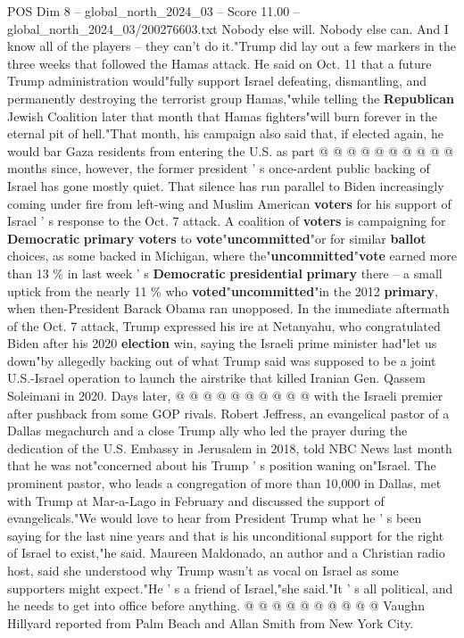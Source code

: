 \begin{textsample}{POS Dim 8 – global\_north\_2024\_03 – Score 11.00 – global\_north\_2024\_03/200276603.txt}
Nobody else will.
Nobody else can.
And I know all of the players -- they can't do it."Trump did lay out a few markers in the three weeks that followed the Hamas attack.
He said on Oct. 11 that a future Trump administration would"fully support Israel defeating, dismantling, and permanently destroying the terrorist group Hamas,"while telling the \textbf{Republican} Jewish Coalition later that month that Hamas fighters"will burn forever in the eternal pit of hell."That month, his campaign also said that, if elected again, he would bar Gaza residents from entering the U.S. as part @ @ @ @ @ @ @ @ @ @ months since, however, the former president ' s once-ardent public backing of Israel has gone mostly quiet.
That silence has run parallel to Biden increasingly coming under fire from left-wing and Muslim American \textbf{voters} for his support of Israel ' s response to the Oct. 7 attack.
A coalition of \textbf{voters} is campaigning for \textbf{Democratic} \textbf{primary} \textbf{voters} to \textbf{vote}"\textbf{uncommitted}"or for similar \textbf{ballot} choices, as some backed in Michigan, where the"\textbf{uncommitted}"\textbf{vote} earned more than 13 \% in last week ' s \textbf{Democratic} \textbf{presidential} \textbf{primary} there -- a small uptick from the nearly 11 \% who \textbf{voted}"\textbf{uncommitted}"in the 2012 \textbf{primary}, when then-President Barack Obama ran unopposed.
In the immediate aftermath of the Oct. 7 attack, Trump expressed his ire at Netanyahu, who congratulated Biden after his 2020 \textbf{election} win, saying the Israeli prime minister had"let us down"by allegedly backing out of what Trump said was supposed to be a joint U.S.-Israel operation to launch the airstrike that killed Iranian Gen.
Qassem Soleimani in 2020.
Days later, @ @ @ @ @ @ @ @ @ @ with the Israeli premier after pushback from some GOP rivals.
Robert Jeffress, an evangelical pastor of a Dallas megachurch and a close Trump ally who led the prayer during the dedication of the U.S.
Embassy in Jerusalem in 2018, told NBC News last month that he was not"concerned about his Trump ' s position waning on"Israel.
The prominent pastor, who leads a congregation of more than 10,000 in Dallas, met with Trump at Mar-a-Lago in February and discussed the support of evangelicals."We would love to hear from President Trump what he ' s been saying for the last nine years and that is his unconditional support for the right of Israel to exist,"he said.
Maureen Maldonado, an author and a Christian radio host, said she understood why Trump wasn't as vocal on Israel as some supporters might expect."He ' s a friend of Israel,"she said."It ' s all political, and he needs to get into office before anything. @ @ @ @ @ @ @ @ @ @ Vaughn Hillyard reported from Palm Beach and Allan Smith from New York City.

\end{textsample}
